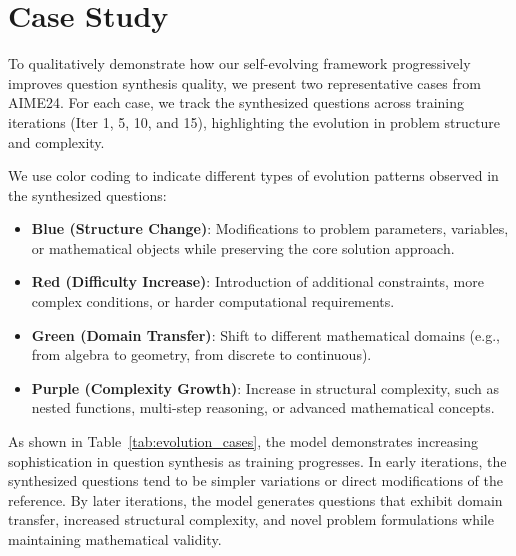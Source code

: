 \section{Case Study}
\label{sec:case_study}


To qualitatively demonstrate how our self-evolving framework progressively improves question synthesis quality, we present two representative cases from AIME24. For each case, we track the synthesized questions across training iterations (Iter 1, 5, 10, and 15), highlighting the evolution in problem structure and complexity.

We use color coding to indicate different types of evolution patterns observed in the synthesized questions:
\begin{itemize}
    \item \textcolor{evolve1}{\textbf{Blue (Structure Change)}}: Modifications to problem parameters, variables, or mathematical objects while preserving the core solution approach.
    \item \textcolor{evolve2}{\textbf{Red (Difficulty Increase)}}: Introduction of additional constraints, more complex conditions, or harder computational requirements.
    \item \textcolor{evolve3}{\textbf{Green (Domain Transfer)}}: Shift to different mathematical domains (e.g., from algebra to geometry, from discrete to continuous).
    \item \textcolor{evolve4}{\textbf{Purple (Complexity Growth)}}: Increase in structural complexity, such as nested functions, multi-step reasoning, or advanced mathematical concepts.
\end{itemize}

As shown in Table~\ref{tab:evolution_cases}, the model demonstrates increasing sophistication in question synthesis as training progresses. In early iterations, the synthesized questions tend to be simpler variations or direct modifications of the reference. By later iterations, the model generates questions that exhibit domain transfer, increased structural complexity, and novel problem formulations while maintaining mathematical validity.

